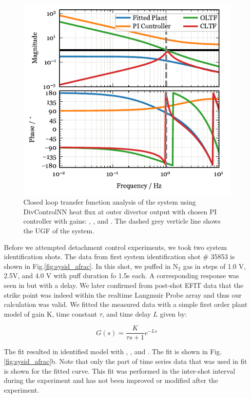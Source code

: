 \begin{figure}[!h]
 \centering
 \includegraphics[width=\linewidth]{figures/SM_LoopStability.pdf}
 \caption{Closed loop transfer function analysis of the system using DivControlNN heat flux at outer divertor output with chosen PI controller with gains: \SMKp, \SMTi, and \SMstau.
The dashed grey verticle line shows the \ac{UGF} of the system.}
\label{fig:cltf_sm}
\end{figure}

Before we attempted detachment control experiments, we took two system identification shots.
The data from first system identification shot \# 35853 is shown in Fig.\ref{fig:sysid_afrac}.
In this shot, we puffed in N$_2$ gas in steps of 1.0 V, 2.5V, and 4.0 V with puff duration fo 1.5s each.
A corresponding response was seen in \Afrac but with a delay.
We later confirmed from post-shot EFIT data that the strike point was indeed within the realtime Langmuir Probe array and thus our \Afrac calculation was valid.
We fitted the measured data with a simple first order plant model of gain K, time constant $\tau$, and time delay $L$ given by:

\begin{equation}
    G(s) = \frac{K}{\tau s + 1}e^{-L s}
\label{eq:sysid}
\end{equation}

The fit resulted in identified model with \AfracK, \AfracTau, and \AfracL.
The fit is shown in Fig.\ref{fig:sysid_afrac}b.
Note that only the part of time series data that was used in fit is shown for the fitted curve.
This fit was performed in the inter-shot interval during the experiment and has not been improved or modified after the experiment.


